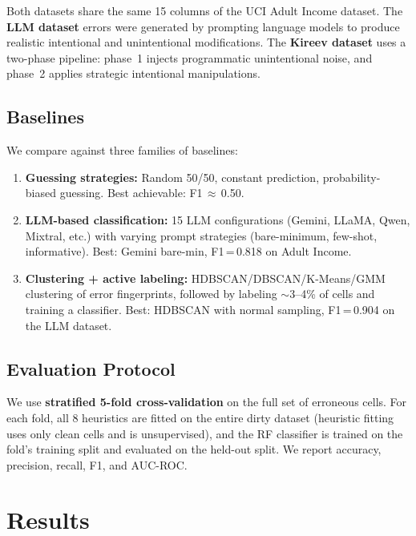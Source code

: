 \documentclass[11pt,a4paper]{article}
\begin{document}
Both datasets share the same 15 columns of the UCI Adult Income dataset.
The \textbf{LLM dataset} errors were generated by prompting language models
to produce realistic intentional and unintentional modifications.  The
\textbf{Kireev dataset} uses a two-phase pipeline: phase~1 injects
programmatic unintentional noise, and phase~2 applies strategic intentional
manipulations.

\subsection{Baselines}

We compare against three families of baselines:

\begin{enumerate}[nosep]
  \item \textbf{Guessing strategies:} Random 50/50, constant prediction,
        probability-biased guessing.  Best achievable: F1\,$\approx$\,0.50.
  \item \textbf{LLM-based classification:} 15 LLM configurations (Gemini,
        LLaMA, Qwen, Mixtral, etc.) with varying prompt strategies
        (bare-minimum, few-shot, informative).  Best: Gemini bare-min,
        F1\,=\,0.818 on Adult Income.
  \item \textbf{Clustering + active labeling:} HDBSCAN/DBSCAN/K-Means/GMM
        clustering of error fingerprints, followed by labeling $\sim$3--4\%
        of cells and training a classifier.  Best: HDBSCAN with normal
        sampling, F1\,=\,0.904 on the LLM dataset.
\end{enumerate}

\subsection{Evaluation Protocol}

We use \textbf{stratified 5-fold cross-validation} on the full set of
erroneous cells.  For each fold, all 8 heuristics are fitted on the entire
dirty dataset (heuristic fitting uses only clean cells and is unsupervised),
and the RF classifier is trained on the fold's training split and evaluated
on the held-out split.  We report accuracy, precision, recall, F1, and
AUC-ROC.

\section{Results}
\label{sec:results}
\end{document}
